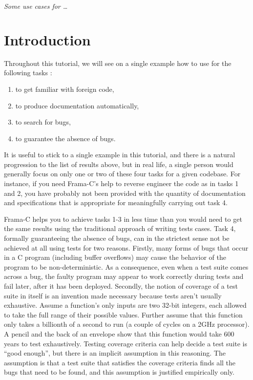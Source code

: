 \documentclass{frama-c-book}
\begin{document}
{\em Some use cases for \Eva{}\ldots}

\vspace{2cm}

\section{Introduction}

Throughout this tutorial, we will see on a single example how to use
\Eva{} for the following tasks :
\begin{enumerate}
\item to get familiar with foreign code,
\item to produce documentation automatically,
\item to search for bugs,
\item to guarantee the absence of bugs.
\end{enumerate}
It is useful to stick to a single example in this tutorial, and
there is a natural progression to the list of results above,
but in real life, a single person would generally focus on
only one or two of these four tasks for a given
codebase. For instance, if you need Frama-C's help to reverse
engineer the code as in tasks 1 and 2, you have
probably not been provided with the quantity of documentation
and specifications
that is appropriate for meaningfully carrying out task 4.

Frama-C helps you to achieve tasks 1-3 in less time than you would
need to get the same results using the traditional approach of writing
tests cases. Task 4, formally guaranteeing the absence of bugs, can in
the strictest sense not be achieved at all using tests for two
reasons.  Firstly, many forms of bugs that occur in a C program
(including buffer overflows) may cause the behavior of the program to
be non-deterministic.  As a consequence, even when a test suite comes
across a bug, the faulty program may appear to work correctly during
tests and fail later, after it has been deployed.  Secondly, the
notion of coverage of a test suite in itself is an invention made
necessary because tests aren't usually exhaustive.  Assume a
function's only inputs are two 32-bit integers, each allowed to take
the full range of their possible values.  Further assume that this
function only takes a billionth of a second to run (a couple of cycles
on a 2GHz processor).  A pencil and the back of an envelope show that
this function would take 600 years to test exhaustively.  Testing
coverage criteria can help decide a test suite is ``good enough'', but
there is an implicit assumption in this reasoning.  The assumption is
that a test suite that satisfies the coverage criteria finds all the
bugs that need to be found, and this assumption is justified
empirically only.
\end{document}
